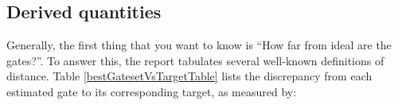 \documentclass{article}[11pt]
\begin{document}
\clearpage

\subsection{Derived quantities\label{derivedQtySection}}

Generally, the first thing that you want to know is ``How far from ideal are the gates?''.  To answer this, the report tabulates several well-known definitions of distance.  Table \ref{bestGatesetVsTargetTable} lists the discrepancy from each estimated gate to its corresponding target, as measured by:
\end{document}
